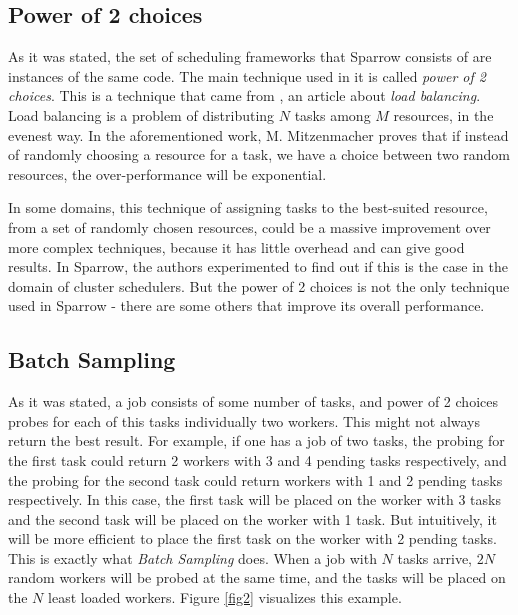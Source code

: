 \documentclass[11pt]{article}
\begin{document}
	\subsection{Power of 2 choices}

		As it was stated, the set of scheduling frameworks that Sparrow consists of are instances of the same code. The main technique used in it is called \textit{power of 2 choices}. This is a technique that came from \cite{power}, an article about \textit{load balancing}. Load balancing is a problem of distributing $N$ tasks among $M$ resources, in the evenest way. In the aforementioned work, M. Mitzenmacher proves that if instead of randomly choosing a resource for a task, we have a choice between two random resources, the over-performance will be exponential.

		In some domains, this technique of assigning tasks to the best-suited resource, from a set of randomly chosen resources, could be a massive improvement over more complex techniques, because it has little overhead and can give good results. In Sparrow, the authors experimented to find out if this is the case in the domain of cluster schedulers. But the power of 2 choices is not the only technique used in Sparrow - there are some others that improve its overall performance.
        
        
    \subsection{Batch Sampling}
    	\label{batchsampling}
    
    	As it was stated, a job consists of some number of tasks, and power of 2 choices probes for each of this tasks individually two workers. This might not always return the best result. For example, if one has a job of two tasks, the probing for the first task could return 2 workers with 3 and 4 pending tasks respectively, and the probing for the second task could return workers with 1 and 2 pending tasks respectively. In this case, the first task will be placed on the worker with 3 tasks and the second task will be placed on the worker with 1 task. But intuitively, it will be more efficient to place the first task on the worker with 2 pending tasks. This is exactly what \textit{Batch Sampling} does. When a job with $N$ tasks arrive, $2N$ random workers will be probed at the same time, and the tasks will be placed on the $N$ least loaded workers. Figure \ref{fig2} visualizes this example.
    
\end{document}
